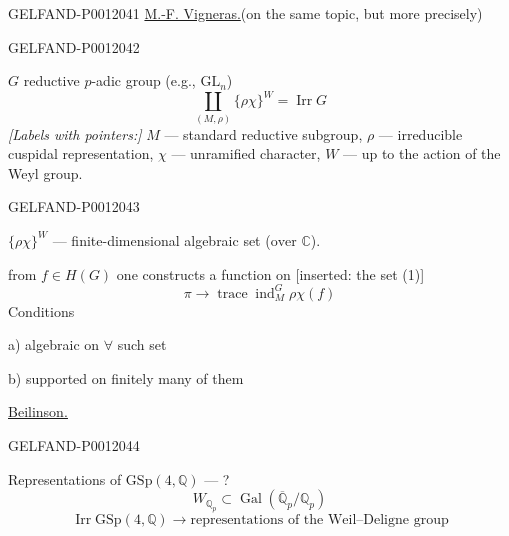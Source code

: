\begin{GelfandAdjacentEvidence}{GELFAND-P001204}{1}
\underline{M.-F. Vigneras.}\quad (on the same topic, but more precisely)
\end{GelfandAdjacentEvidence}
\begin{GelfandAdjacentEvidence}{GELFAND-P001204}{2}


\(G\) reductive \(p\)-adic group (e.g., \(\mathrm{GL}_n\))
\begin{equation*}
\coprod_{(M,\rho)}\{\rho\chi\}^{W}=\operatorname{Irr}G \tag{1}
\end{equation*}
\textit{[Labels with pointers:]} \(M\) --- standard reductive subgroup,
\(\rho\) --- irreducible cuspidal representation,
\(\chi\) --- unramified character,
\(W\) --- up to the action of the Weyl group.
\end{GelfandAdjacentEvidence}
\begin{GelfandAdjacentEvidence}{GELFAND-P001204}{3}


\(\{\rho\chi\}^{W}\) --- finite-dimensional algebraic set (\(\text{over }\mathbb C\)).

from \(f\in H(G)\) one constructs a function on [inserted: the set (1)]
\[
\pi\longrightarrow\operatorname{trace}\operatorname{ind}_{M}^{G}\rho\chi(f)
\]
Conditions

a) algebraic on \(\forall\) such set

b) supported on finitely many of them

\underline{\underline{Beilinson.}}
\end{GelfandAdjacentEvidence}
\begin{GelfandAdjacentEvidence}{GELFAND-P001204}{4}


Representations of \(\mathrm{GSp}(4,\mathbb Q)\) --- ?
\[
W_{\mathbb Q_p}\subset\operatorname{Gal}(\overline{\mathbb Q}_p/\mathbb Q_p)
\]
\[
\operatorname{Irr}\mathrm{GSp}(4,\mathbb Q)
\longrightarrow \text{representations of the Weil--Deligne group}
\]
\end{GelfandAdjacentEvidence}
